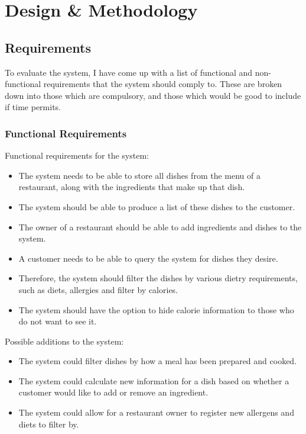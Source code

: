 \chapter{Design \& Methodology}

\section{Requirements}

To evaluate the system, I have come up with a list of functional and non-functional requirements that the system should comply to. These are broken down into those which are compulsory, and those which would be good to include if time permits.

\subsection{Functional Requirements}

Functional requirements for the system:

\begin{itemize}
\item The system needs to be able to store all dishes from the menu of a restaurant, along with the ingredients that make up that dish.
\item The system should be able to produce a list of these dishes to the customer.
\item The owner of a restaurant should be able to add ingredients and dishes to the system.
\item A customer needs to be able to query the system for dishes they desire.
\item Therefore, the system should filter the dishes by various dietry requirements, such as diets, allergies and filter by calories.
\item The system should have the option to hide calorie information to those who do not want to see it.
\end{itemize}

Possible additions to the system:

\begin{itemize}
\item The system could filter dishes by how a meal has been prepared and cooked.
\item The system could calculate new information for a dish based on whether a customer would like to add or remove an ingredient.
\item The system could allow for a restaurant owner to register new allergens and diets to filter by.
\end{itemize}

